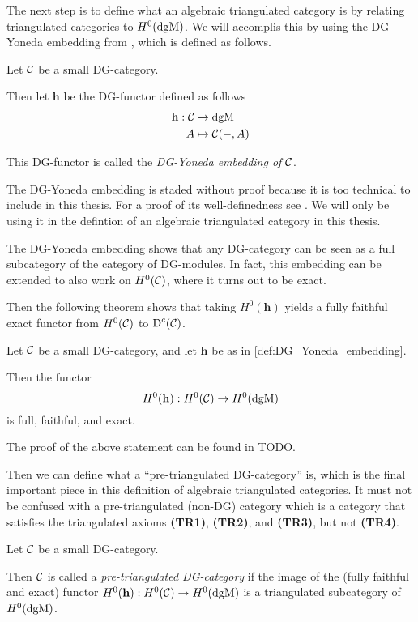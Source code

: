 The next step is to define what an algebraic triangulated category is by relating triangulated categories to \( H^0(\operatorname{dgM}) \). We will accomplis this by using the DG-Yoneda embedding from \cite[Corollary 6.3.6]{Borceux_1994}, which is defined as follows.
\begin{definition}
    \label{def:DG_Yoneda_embedding}
    Let \( {\mathcal{C}} \) be a small DG-category.
    
    Then let \( \mathbf{h} \) be the DG-functor defined as follows
    \begin{align*}
        \mathbf{h}: {\mathcal{C}} &\to \operatorname{dgM} \\
        A &\mapsto {\mathcal{C}}(-, A)
    \end{align*}

    This DG-functor is called the \emph{DG-Yoneda embedding of \( {\mathcal{C}} \)}.
\end{definition}

The DG-Yoneda embedding is staded without proof because it is too technical to include in this thesis. For a proof of its well-definedness see \cite[Corollary 6.3.6]{Borceux_1994}. We will only be using it in the defintion of an algebraic triangulated category in this thesis.

The DG-Yoneda embedding shows that any DG-category can be seen as a full subcategory of the category of DG-modules. In fact, this embedding can be extended to also work on \( H^0({\mathcal{C}}) \), where it turns out to be exact.

Then the following theorem shows that taking \( H^0(\mathbf{h}) \) yields a fully faithful exact functor from \( H^0({\mathcal{C}}) \) to \( \operatorname{D}^c({\mathcal{C}}) \).

\begin{theorem}
    Let \( {\mathcal{C}} \) be a small DG-category, and let \( \mathbf{h} \) be as in \autoref{def:DG_Yoneda_embedding}.

    Then the functor
    \[
        H^0(\mathbf{h}): H^0({\mathcal{C}}) \to H^0(\operatorname{dgM})
    \]
    is full, faithful, and exact.
\end{theorem}
The proof of the above statement can be found in TODO.

Then we can define what a ``pre-triangulated DG-category'' is, which is the final important piece in this definition of algebraic triangulated categories. It must not be confused with a pre-triangulated (non-DG) category which is a category that satisfies the triangulated axioms {\bf (TR1)}, {\bf (TR2)}, and {\bf (TR3)}, but not {\bf (TR4)}.
\begin{definition}
    Let \( {\mathcal{C}} \) be a small DG-category.

    Then \( {\mathcal{C}} \) is called a \emph{pre-triangulated DG-category} if the image of the (fully faithful and exact) functor \( H^0(\mathbf{h}): H^0({\mathcal{C}}) \to H^0(\operatorname{dgM}) \) is a triangulated subcategory of \( H^0(\operatorname{dgM}) \).
\end{definition}

